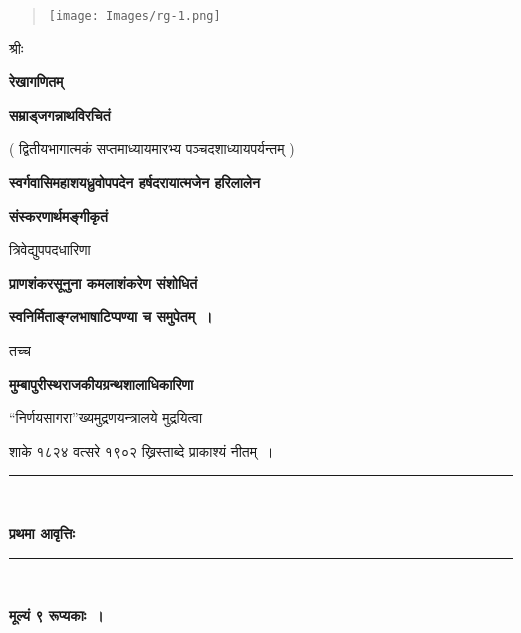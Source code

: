\documentclass[11pt, openany]{book}
\begin{document}
\newpage
\thispagestyle{empty}

\vspace*{2in}
\begin{quote}

\centerline{\texttt{[image: Images/rg-1.png]}}

\end{quote}

\newpage
\thispagestyle{empty}
\begin{center}
श्रीः
\vspace{5mm}

\textbf{\Huge रेखागणितम् }
\vspace{7mm}

\textbf{\large सम्राड्जगन्नाथविरचितं }
\vspace{6mm}

( द्वितीयभागात्मकं सप्तमाध्यायमारभ्य पञ्चदशाध्यायपर्यन्तम् ) 
\vspace{6mm}

\textbf{स्वर्गवासिमहाशयध्रुवोपपदेन हर्षदरायात्मजेन हरिलालेन }
\vspace{2mm}

\textbf{संस्करणार्थमङ्गीकृतं }
\vspace{6mm}

त्रिवेद्युपपदधारिणा 
\vspace{6mm}

\textbf{\LARGE प्राणशंकरसूनुना कमलाशंकरेण संशोधितं }
\vspace{6mm}

\textbf{स्वनिर्मिताङ्ग्लभाषाटिप्पण्या च समुपेतम्~।}
\vspace{6mm}

तच्च
\vspace{5mm}

\textbf{\large मुम्बापुरीस्थराजकीयग्रन्थशालाधिकारिणा }
\vspace{6mm}

``निर्णयसागरा''ख्यमुद्रणयन्त्रालये मुद्रयित्वा 
\vspace{6mm}

{\small शाके १८२४ वत्सरे १९०२ ख्रिस्ताब्दे प्राकाश्यं नीतम्~। }
\vspace{2mm}

\rule{0.6in}{0.5pt}\\
\vspace{5mm}

\textbf{प्रथमा आवृत्तिः }
\vspace{1mm}

\rule{0.6in}{0.3pt}\\
\vspace{3mm}

\textbf{मूल्यं ९ रूप्यकाः~। }
\end{center}
\end{document}
